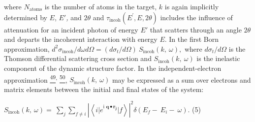 where \(N_{\text{atoms}}\) is the number of atoms in the target, \(k\)
is again implicitly determined by \(E\), \(E'\)\emph{,} and \(2\theta\)
and \(\tau_{\text{incoh}}\left( E^{'},E,2\theta \right)\) includes the
influence of attenuation for an incident photon of energy \(E'\) that
scatters through an angle \(2\theta\) and departs the incoherent
interaction with energy \(E\). In the first Born approximation,
\(d^{2}\sigma_{\text{incoh}}/d\omega d\Omega = (d\sigma_{t}/d\Omega)\ S_{\text{incoh}}\left( k,\ \omega \right),\)
where \(d\sigma_{t}/d\Omega\) is the Thomson differential scattering
cross section and \(S_{\text{incoh}}\left( k,\ \omega \right)\) is the
inelastic component of the dynamic structure factor. In the
independent-electron approximation
\hyperref[j.-chihara-journal-of-physics-condensed-matter-12-231-2000.]{\textsuperscript{49}}\textsuperscript{,}
\hyperref[w.-schuelke-electron-dynamics-by-inelastic-x-ray-scattering-oxford-university-press-new-york-2007.]{\textsuperscript{50}},
\(S_{\text{incoh}}\left( k,\ \omega \right)\) may be expressed as a sum
over electrons and matrix elements between the initial and final states
of the system:

\(S_{\text{incoh}}\left( k,\ \omega \right) = \ \sum_{j}^{}{\sum_{f \neq i}^{}{\left| \left\langle {i|e}^{\text{i\ }\mathbf{q \bullet}\mathbf{r}_{\mathbf{j}}}|f \right\rangle \right|^{2}\delta(E_{f} - \ E_{i} - \ \omega)}}\).
(5)

